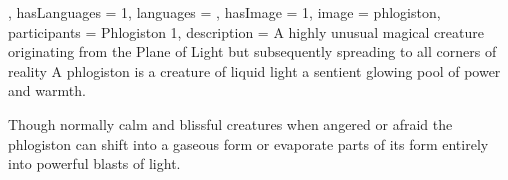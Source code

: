 {{, hasLanguages = 1, languages = , hasImage = 1, image = phlogiston, 
participants = { {Phlogiston 1}}, 
description = A highly unusual magical creature\comma{} originating from the Plane of Light\comma{} but subsequently spreading to all corners of reality\comma{} A phlogiston is a creature of liquid light\comma{} a sentient\comma{} glowing pool of power and warmth. 

Though normally calm and blissful creatures\comma{} when angered or afraid\comma{} the phlogiston can shift into a gaseous form\comma{} or evaporate parts of its form entirely into powerful blasts of light.}}

